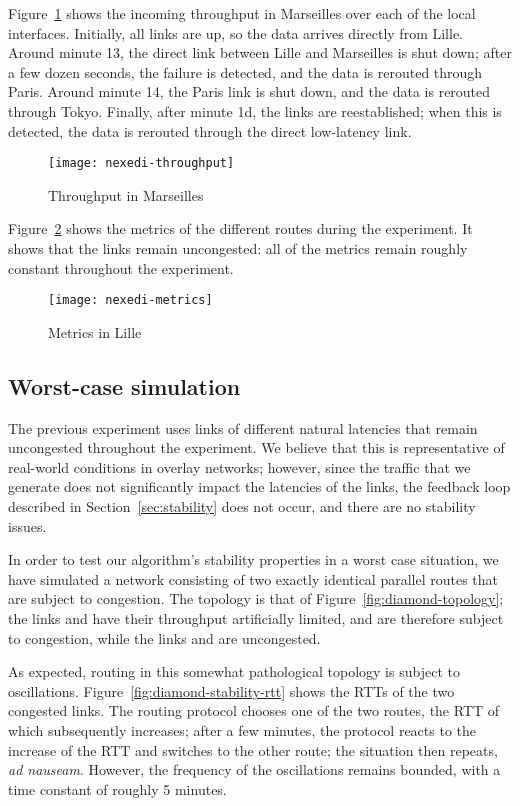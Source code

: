 \documentclass[conference,letterpaper]{IEEEtran}
\begin{document}
Figure~\ref{fig:nexedi-throughput} shows the incoming throughput in
Marseilles over each of the local interfaces.  Initially, all links
are up, so the data arrives directly from Lille.  Around minute 13,
the direct link between Lille and Marseilles is shut down; after a few
dozen seconds, the failure is detected, and the data is rerouted
through Paris.  Around minute 14, the Paris link is shut down, and the
data is rerouted through Tokyo.  Finally, after minute 1d, the links
are reestablished; when this is detected, the data is rerouted through
the direct low-latency link.

\begin{figure}[htb]
\centering
\texttt{[image: nexedi-throughput]}
\caption{Throughput in Marseilles}
\label{fig:nexedi-throughput}
\end{figure}

Figure~\ref{fig:nexedi-metrics} shows the metrics of the different
routes during the experiment.  It shows that the links remain
uncongested: all of the metrics remain roughly constant throughout the
experiment.

\begin{figure}[htb]
\centering
\texttt{[image: nexedi-metrics]}
\caption{Metrics in Lille}
\label{fig:nexedi-metrics}
\end{figure}

\subsection{Worst-case simulation} \label{sec:worst-case}

The previous experiment uses links of different natural latencies that
remain uncongested throughout the experiment.  We believe that this is
representative of real-world conditions in overlay networks; however,
since the traffic that we generate does not significantly impact the
latencies of the links, the feedback loop described in
Section~\ref{sec:stability} does not occur, and there are no stability
issues.

In order to test our algorithm's stability properties in a worst case
situation, we have simulated a network consisting of two exactly
identical parallel routes that are subject to congestion.  The
topology is that of Figure~\ref{fig:diamond-topology}; the links  and  have their throughput artificially limited, and are
therefore subject to congestion, while the links  and
 are uncongested.

As expected, routing in this somewhat pathological topology is subject
to oscillations.  Figure~\ref{fig:diamond-stability-rtt} shows the RTTs
of the two congested links.  The routing protocol chooses one of the
two routes, the RTT of which subsequently increases; after a few
minutes, the protocol reacts to the increase of the RTT and switches
to the other route; the situation then repeats, \emph{ad nauseam}.
However, the frequency of the oscillations remains bounded, with
a time constant of roughly 5 minutes.
\end{document}
